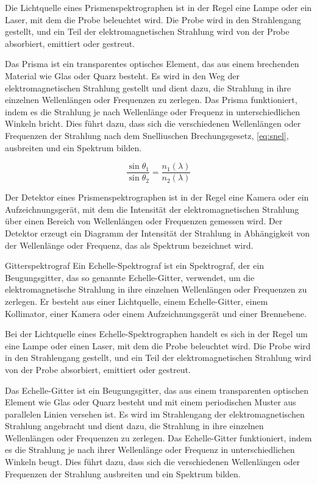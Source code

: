 \documentclass[12pt,english,ngerman]{scrartcl}
\begin{document}
Die Lichtquelle eines Prismenspektrographen ist in der Regel eine Lampe oder ein Laser, mit dem die Probe beleuchtet 
wird. Die Probe wird in den Strahlengang gestellt, und ein Teil der elektromagnetischen Strahlung wird von der Probe 
absorbiert, emittiert oder gestreut.

Das Prisma ist ein transparentes optisches Element, das aus einem brechenden Material wie Glas oder Quarz besteht. Es 
wird in den Weg der elektromagnetischen Strahlung gestellt und dient dazu, die Strahlung in ihre einzelnen Wellenlängen
oder Frequenzen zu zerlegen. Das Prisma funktioniert, indem es die Strahlung je nach Wellenlänge oder Frequenz in 
unterschiedlichen Winkeln bricht. Dies führt dazu, dass sich die verschiedenen Wellenlängen oder Frequenzen der Strahlung 
nach dem Snelliuschen Brechungsgesetz, \autoref{eq:snel}, ausbreiten und ein Spektrum bilden. 

\begin{equation}
	\frac{\sin{\theta_1}}{\sin{\theta_2}} = \frac{n_1(\lambda)}{n_2(\lambda)}
	\label{eq:snel}
\end{equation}


Der Detektor eines Prismenspektrographen ist in der Regel eine Kamera oder ein Aufzeichnungsgerät, mit dem die Intensität 
der elektromagnetischen Strahlung über einen Bereich von Wellenlängen oder Frequenzen gemessen wird. Der Detektor erzeugt 
ein Diagramm der Intensität der Strahlung in Abhängigkeit von der Wellenlänge oder Frequenz, das als Spektrum bezeichnet 
wird.

Gitterspektrograf
Ein Echelle-Spektrograf ist ein Spektrograf, der ein Beugungsgitter, das so genannte Echelle-Gitter, verwendet, um die 
elektromagnetische Strahlung in ihre einzelnen Wellenlängen oder Frequenzen zu zerlegen. Er besteht aus einer Lichtquelle, 
einem Echelle-Gitter, einem Kollimator, einer Kamera oder einem Aufzeichnungsgerät und einer Brennebene.

Bei der Lichtquelle eines Echelle-Spektrographen handelt es sich in der Regel um eine Lampe oder einen Laser, mit dem die 
Probe beleuchtet wird. Die Probe wird in den Strahlengang gestellt, und ein Teil der elektromagnetischen Strahlung wird von 
der Probe absorbiert, emittiert oder gestreut.

Das Echelle-Gitter ist ein Beugungsgitter, das aus einem transparenten optischen Element wie Glas oder Quarz besteht und 
mit einem periodischen Muster aus parallelen Linien versehen ist. Es wird im Strahlengang der elektromagnetischen Strahlung 
angebracht und dient dazu, die Strahlung in ihre einzelnen Wellenlängen oder Frequenzen zu zerlegen. Das Echelle-Gitter 
funktioniert, indem es die Strahlung je nach ihrer Wellenlänge oder Frequenz in unterschiedlichen Winkeln beugt. Dies führt 
dazu, dass sich die verschiedenen Wellenlängen oder Frequenzen der Strahlung ausbreiten und ein Spektrum bilden.
\end{document}
